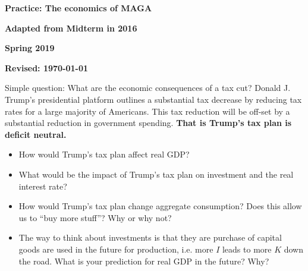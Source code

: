 \documentclass[12pt,pdftex,twoside,letterpaper]{exam}
\begin{document}
\centerline{\Large\bf Practice: The economics of MAGA }
\vspace{3mm}
\centerline{\Large\bf Adapted from Midterm in 2016}
\vspace{1mm}
\centerline{\large\bf Spring 2019}
\vspace{3mm}
\centerline{\bf Revised:  \today}
\bigskip

Simple question: What are the economic consequences of a tax cut?  Donald J. Trump's presidential platform outlines a substantial tax decrease by reducing tax rates for a large majority of Americans. This tax reduction will be off-set by a substantial reduction in government spending. \textbf{That is Trump's tax plan is deficit neutral.}

\begin{itemize}
\item How would Trump's tax plan affect real GDP?

\item What would be the impact of Trump's tax plan on investment and the real interest rate?

\item How would Trump's tax plan change aggregate consumption? Does this allow us to ``buy more stuff''? Why or why not?

\item The way to think about investments is that they are purchase of capital goods are used in the future for production, i.e. more $I$ leads to more $K$ down the road. What is your prediction for real GDP in the future? Why?

\end{itemize}
\end{document}
